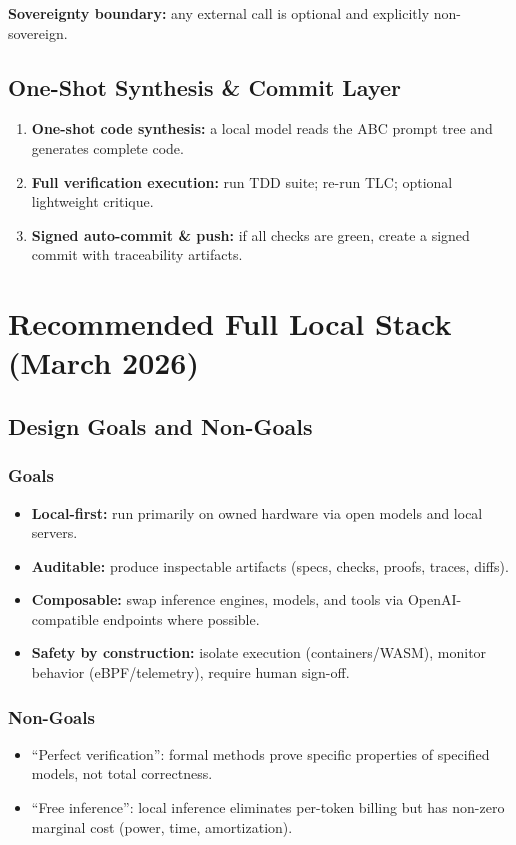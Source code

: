 \documentclass[11pt]{article}
\begin{document}
\textbf{Sovereignty boundary:} any external call is optional and explicitly non-sovereign.

\subsection{One-Shot Synthesis \& Commit Layer}

\begin{enumerate}[leftmargin=2em]
  \item \textbf{One-shot code synthesis:} a local model reads the ABC prompt tree and generates complete code.
  \item \textbf{Full verification execution:} run TDD suite; re-run TLC; optional lightweight critique.
  \item \textbf{Signed auto-commit \& push:} if all checks are green, create a signed commit with traceability artifacts.
\end{enumerate}

\section{Recommended Full Local Stack (March 2026)}
\label{sec:stack}

\subsection{Design Goals and Non-Goals}

\subsubsection{Goals}
\begin{itemize}
  \item \textbf{Local-first:} run primarily on owned hardware via open models and local servers.
  \item \textbf{Auditable:} produce inspectable artifacts (specs, checks, proofs, traces, diffs).
  \item \textbf{Composable:} swap inference engines, models, and tools via OpenAI-compatible endpoints where possible.
  \item \textbf{Safety by construction:} isolate execution (containers/WASM), monitor behavior (eBPF/telemetry), require human sign-off.
\end{itemize}

\subsubsection{Non-Goals}
\begin{itemize}
  \item ``Perfect verification'': formal methods prove specific properties of specified models, not total correctness.
  \item ``Free inference'': local inference eliminates per-token billing but has non-zero marginal cost (power, time, amortization).
\end{itemize}
\end{document}
